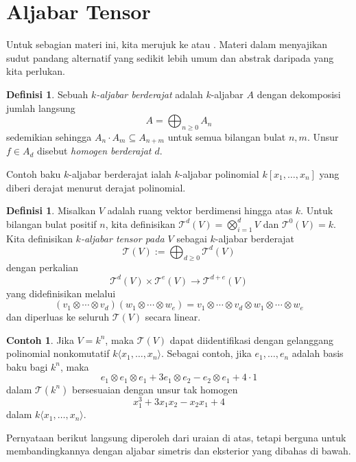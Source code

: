 \documentclass[12pt]{article}
\theoremstyle{plain}
\theoremstyle{definition}
\newtheorem{definition}[theorem]{Definisi}
\newtheorem{example}[theorem]{Contoh}
\theoremstyle{remark}
\numberwithin{equation}{section}
\begin{document}
\section{Aljabar Tensor}

Untuk sebagian materi ini, kita merujuk ke \cite[\S{11.5}]{DF} atau \cite{Lang}.
Materi dalam \cite[\S{A.2}]{Eisenbud} menyajikan sudut pandang alternatif
yang sedikit lebih umum dan abstrak daripada yang kita perlukan.

\begin{definition}
Sebuah \emph{$k$-aljabar berderajat} adalah $k$-aljabar $A$ dengan dekomposisi
jumlah langsung
\[
A = \bigoplus_{n \ge 0} A_n
\]
sedemikian sehingga $A_n \cdot A_m \subseteq A_{n+m}$ untuk semua bilangan bulat $n,m$.
Unsur $f \in A_d$ disebut \emph{homogen berderajat $d$}.
\end{definition}

Contoh baku $k$-aljabar berderajat ialah
$k$-aljabar polinomial $k[x_1,\ldots,x_n]$ yang diberi derajat menurut derajat polinomial.

\begin{definition}
Misalkan $V$ adalah ruang vektor berdimensi hingga atas $k$. Untuk bilangan bulat positif
$n$, kita definisikan $\mathcal{T}^d(V)=\bigotimes_{i=1}^d V$ dan
$\mathcal{T}^0(V)=k$. Kita definisikan \emph{$k$-aljabar tensor pada $V$}
sebagai $k$-aljabar berderajat
\[
\mathcal{T}(V) := \bigoplus_{d \ge 0} \mathcal{T}^d(V)
\]
dengan perkalian
\[\mathcal{T}^d(V) \times \mathcal{T}^e(V)
\to \mathcal{T}^{d+e}(V)
\]
yang didefinisikan melalui
\[
(v_1 \otimes \cdots \otimes v_d) (w_1 \otimes \cdots \otimes w_e)
=v_1 \otimes \cdots \otimes v_d \otimes w_1 \otimes \cdots \otimes w_e
\]
dan diperluas ke seluruh $\mathcal{T}(V)$ secara linear. 
\end{definition}

\begin{example}
Jika $V=k^n$, maka $\mathcal{T}(V)$ dapat diidentifikasi dengan
gelanggang polinomial nonkomutatif $k\langle x_1,\ldots, x_n\rangle$.
Sebagai contoh, jika $e_1,\ldots, e_n$ adalah basis baku bagi $k^n$,
maka
\[
e_1 \otimes e_1 \otimes e_1 + 3e_1 \otimes e_2 - e_2\otimes e_1 + 4\cdot 1
\]
dalam $\mathcal{T}(k^n)$
bersesuaian dengan unsur tak homogen
\[
x_1^3 + 3x_1x_2 - x_2x_1 + 4
\]
dalam $k\langle x_1,\ldots, x_n\rangle$.
\end{example}

Pernyataan berikut langsung diperoleh dari uraian di atas,
tetapi berguna untuk membandingkannya dengan aljabar simetris dan eksterior
yang dibahas di bawah.
\end{document}
